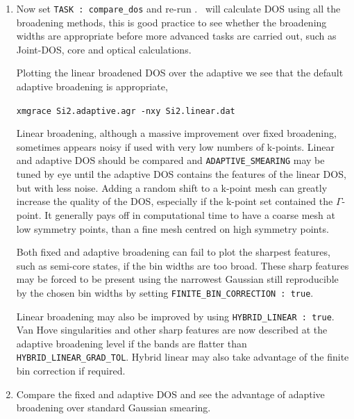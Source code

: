 \documentclass[a4paper,11pt,twoside]{book}
\begin{document}
{\begin{enumerate}
Increasing the number of integration points has improved the band energy of the adaptive smearing:
\begin{verbatim}
|          Band energy (Adaptive broadening) :       1.3623 eV         <- BEA |
\end{verbatim}


\item  Now set {\tt TASK : compare\_dos} and re-run \optados. \optados\ will calculate DOS using all the broadening methods, this is good practice to see whether the broadening widths are appropriate before more advanced tasks are carried out, such as Joint-DOS, core and optical calculations.

Plotting the linear broadened DOS over the adaptive we see that the default adaptive broadening is appropriate,

\verb#xmgrace Si2.adaptive.agr -nxy Si2.linear.dat#

Linear broadening, although a massive improvement over fixed broadening, sometimes appears noisy if used with very low numbers of k-points. Linear and adaptive DOS should be compared and \verb#ADAPTIVE_SMEARING# may be tuned by eye until the adaptive DOS contains the features of the linear DOS, but with less noise.  Adding a random shift to a k-point mesh can greatly increase the quality of the DOS, especially if the k-point set contained the $\Gamma$-point. It generally pays off in computational time to have a coarse mesh at low symmetry points, than a fine mesh centred on high symmetry points. 

Both fixed and adaptive broadening can fail to plot the sharpest features, such as semi-core states, if the bin widths are too broad. These sharp features may be forced to be present using the narrowest Gaussian still reproducible by the chosen bin widths by setting \verb#FINITE_BIN_CORRECTION : true#.  

Linear broadening may also be improved by using \verb#HYBRID_LINEAR : true#. Van Hove singularities and other sharp features are now described at the adaptive broadening level if the bands are flatter than \verb#HYBRID_LINEAR_GRAD_TOL#. Hybrid linear may also take advantage of the finite bin correction if required.

\item Compare the fixed and adaptive DOS and see the advantage of adaptive broadening over standard Gaussian smearing.

\end{enumerate}


}
\end{document}

